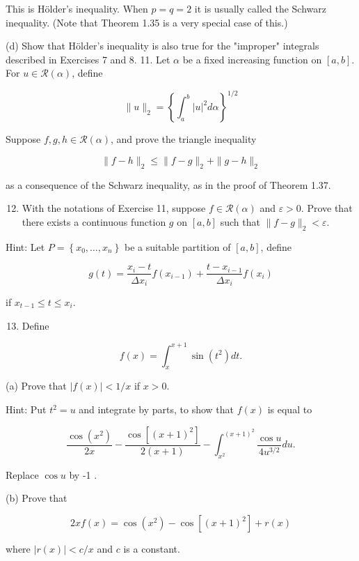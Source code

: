 \documentclass[10pt]{article}
\begin{document}
This is Hölder's inequality. When $p=q=2$ it is usually called the Schwarz inequality. (Note that Theorem 1.35 is a very special case of this.)

(d) Show that Hölder's inequality is also true for the "improper" integrals described in Exercises 7 and 8. 11. Let $\alpha$ be a fixed increasing function on $[a, b]$. For $u \in \mathscr{R}(\alpha)$, define

$$
\|u\|_{2}=\left\{\int_{a}^{b}|u|^{2} d \alpha\right\}^{1 / 2}
$$

Suppose $f, g, h \in \mathscr{R}(\alpha)$, and prove the triangle inequality

$$
\|f-h\|_{2} \leq\|f-g\|_{2}+\|g-h\|_{2}
$$

as a consequence of the Schwarz inequality, as in the proof of Theorem 1.37.

\begin{enumerate}
  \setcounter{enumi}{11}
  \item With the notations of Exercise 11, suppose $f \in \mathscr{R}(\alpha)$ and $\varepsilon>0$. Prove that there exists a continuous function $g$ on $[a, b]$ such that $\|f-g\|_{2}<\varepsilon$.
\end{enumerate}

Hint: Let $P=\left\{x_{0}, \ldots, x_{n}\right\}$ be a suitable partition of $[a, b]$, define

$$
g(t)=\frac{x_{i}-t}{\Delta x_{i}} f\left(x_{i-1}\right)+\frac{t-x_{i-1}}{\Delta x_{i}} f\left(x_{i}\right)
$$

if $x_{t-1} \leq t \leq x_{i}$.

\begin{enumerate}
  \setcounter{enumi}{12}
  \item Define
\end{enumerate}

$$
f(x)=\int_{x}^{x+1} \sin \left(t^{2}\right) d t .
$$

(a) Prove that $|f(x)|<1 / x$ if $x>0$.

Hint: Put $t^{2}=u$ and integrate by parts, to show that $f(x)$ is equal to

$$
\frac{\cos \left(x^{2}\right)}{2 x}-\frac{\cos \left[(x+1)^{2}\right]}{2(x+1)}-\int_{x^{2}}^{(x+1)^{2}} \frac{\cos u}{4 u^{3 / 2}} d u .
$$

Replace $\cos u$ by -1 .

(b) Prove that

$$
2 x f(x)=\cos \left(x^{2}\right)-\cos \left[(x+1)^{2}\right]+r(x)
$$

where $|r(x)|<c / x$ and $c$ is a constant.
\end{document}
